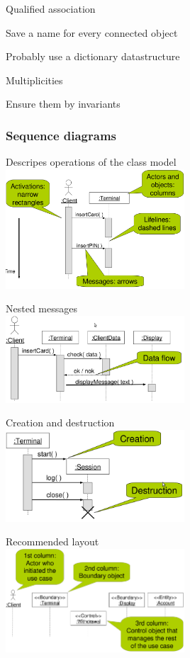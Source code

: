 	\item Qualified association
	\enumstart
		\item Save a name for every connected object
		\item Probably use a dictionary datastructure
	\enumend

	\item Multiplicities
	\enumstart
		\item Ensure them by invariants
	\enumend
\enumend

\subsubsection{Sequence diagrams}
\enumstart
	\item Descripes operations of the class model
	\\ \includegraphics[width=0.5\textwidth]{img/sequence_diagram.png}

	\item Nested messages
	\\ \includegraphics[width=0.5\textwidth]{img/nested_messages.png}
	
	\item Creation and destruction
	\\ \includegraphics[width=0.5\textwidth]{img/creation_destruction.png}
	
	\item Recommended layout
	\\ \includegraphics[width=0.5\textwidth]{img/recommended_layout.png}
	
